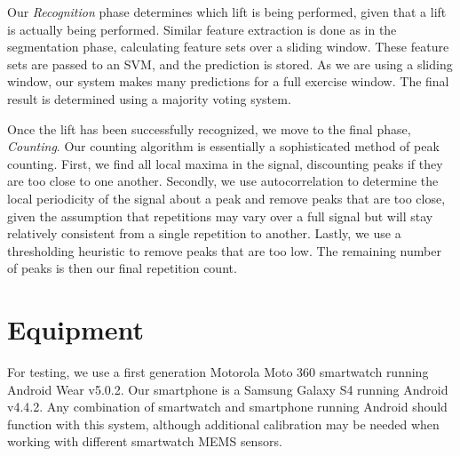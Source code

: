 Our \textit{Recognition} phase determines which lift is being performed, given that a lift is actually being performed. Similar feature extraction is done as in the segmentation phase, calculating feature sets over a sliding window. These feature sets are passed to an SVM, and the prediction is stored. As we are using a sliding window, our system makes many predictions for a full exercise window. The final result is determined using a majority voting system.

Once the lift has been successfully recognized, we move to the final phase, \textit{Counting}. Our counting algorithm is essentially a sophisticated method of peak counting. First, we find all local maxima in the signal, discounting peaks if they are too close to one another. Secondly, we use autocorrelation to determine the local periodicity of the signal about a peak and remove peaks that are too close, given the assumption that repetitions may vary over a full signal but will stay relatively consistent from a single repetition to another. Lastly, we use a thresholding heuristic to remove peaks that are too low. The remaining number of peaks is then our final repetition count. 

\section{Equipment}

For testing, we use a first generation Motorola Moto 360 smartwatch running Android Wear v5.0.2. Our smartphone is a Samsung Galaxy S4 running Android v4.4.2. Any combination of smartwatch and smartphone running Android should function with this system, although additional calibration may be needed when working with different smartwatch MEMS sensors.